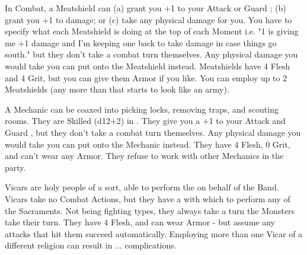 
    In Combat, a Meatshield can (a) grant you +1 to your Attack or Guard \RO; (b) grant you +1 to damage; or (c) take any physical damage for you.  You have to specify what each Meatshield is doing at the top of each Moment i.e. "1 is giving me +1 damage and I'm keeping one back to take damage in case things go south." but they don't take a combat turn themselves.  Any physical damage you would take you can put onto the Meatshield instead.  Meatshields have 4 Flesh and 4 Grit, but you can give them Armor if you like. You can employ up to 2 Meatshields (any more than that starts to look like an army).



    A Mechanic can be coaxed into picking locks, removing traps, and scouting rooms.  They are Skilled (d12+2) in .  They give you a +1 to your Attack and Guard \RO, but they don't take a combat turn themselves.  Any physical damage you would take you can put onto the Mechanic instead.  They have 4 Flesh, 0 Grit, and can't wear any Armor. They refuse to work with other Mechanics in the party.


    Vicars are holy people of a sort, able to perform the  on behalf of the Band. Vicars take no Combat Actions, but they have a  with which to perform any of the Sacraments. Not being fighting types, they always take a turn  the Monsters take their turn. They have 4 Flesh, and can wear Armor - but assume any attacks that hit them succeed automatically. Employing more than one Vicar of a different religion can result in ... complications.

